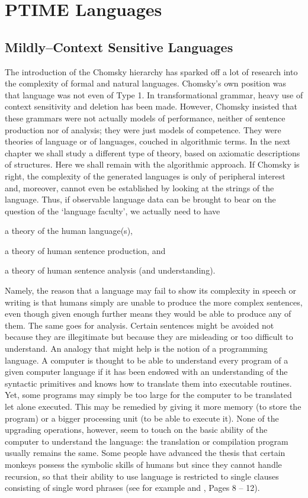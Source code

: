 \chapter{PTIME Languages}
\thispagestyle{empty}
\label{kap4}
%
%
%
\section{Mildly--Context Sensitive Lan\-gua\-ges}
\label{kap4-1}
%
%
%
The introduction of the Chomsky hierarchy has sparked off a lot of
research into the complexity of formal and natural languages.
Chomsky's own 
position was that language was not even of Type 1.
In transformational grammar, heavy use of context sensitivity and
deletion has been made. However, Chomsky insisted that these
grammars were not actually models of performance, neither of
sentence production nor of analysis; they were just models of
competence. They were theories of language or of languages,
couched in algorithmic terms. In the next chapter we shall study a
different type of theory, based on axiomatic descriptions of
structures. Here we shall remain with the algorithmic approach. If
Chomsky is right, the complexity of the generated languages is
only of peripheral interest and, moreover, cannot even be
established by looking at the strings of the language. Thus, 
if observable language data can be brought to bear on the 
question of the `language faculty', we actually need to have 
\begin{dinglist}{43}
\item
a theory of the human language(s),
\item
a theory of human sentence production, and
\item
a theory of human sentence analysis (and understanding).
\end{dinglist}
Namely, the reason that a language may fail to show its complexity 
in speech or writing is that humans simply are unable to produce
the more complex sentences, even though given enough further 
means they would be able to produce any of them. The same
goes for analysis. Certain sentences might be avoided not
because they are illegitimate but because they are misleading
or too difficult to understand. An analogy that might help is
the notion of a programming language. A computer is thought to be 
able to understand every program of a given computer language if 
it has been endowed with an understanding of the syntactic primitives 
and knows how to translate them into executable routines. Yet, some 
programs may simply be too large for the computer to be translated 
let alone executed. This may be remedied by giving it more memory
(to store the program) or a bigger processing unit (to be able
to execute it). None of the upgrading operations, however, seem
to touch on the basic ability of the computer to understand the
language: the translation or compilation program usually remains
the same. Some people have advanced the thesis that certain
monkeys possess the symbolic skills of humans but since they
cannot handle recursion, so that their ability to use language is
restricted to single clauses consisting of single word 
phrases (see for example \cite{haider:exaptiv} and 
\cite{haider:generativ}, Pages 8 -- 12).

